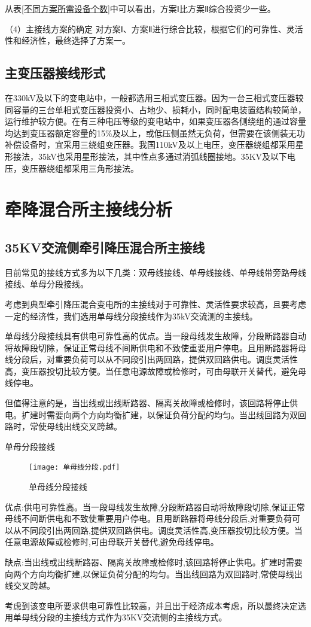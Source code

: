 从表\ref{不同方案所需设备个数}中可以看出，方案Ⅰ比方案Ⅱ综合投资少一些。\par 
（4）主接线方案的确定\newline
对方案Ⅰ、方案Ⅱ进行综合比较，根据它们的可靠性、灵活性和经济性，最终选择了方案一。 

\subsection{主变压器接线形式}
在330kV及以下的变电站中，一般都选用三相式变压器。因为一台三相式变压器较同容量的三台单相式变压器投资小、占地少、损耗小，同时配电装置结构较简单，运行维护较方便。在有三种电压等级的变电站中，如果变压器各侧绕组的通过容量均达到变压器额定容量的15\%及以上，或低压侧虽然无负荷，但需要在该侧装无功补偿设备时，宜采用三绕组变压器。我国110kV及以上电压，变压器绕组都采用星形接法，35kV也采用星形接法，其中性点多通过消弧线圈接地。35KV及以下电压，变压器绕组都采用三角形接法。
\section{牵降混合所主接线分析}

\subsection{35KV交流侧牵引降压混合所主接线}
目前常见的接线方式多为以下几类：双母线接线、单母线接线、单母线带旁路母线接线、单母分段接线。\par 
考虑到典型牵引降压混合变电所的主接线对于可靠性、灵活性要求较高，且要考虑一定的经济性，我们选用单母线分段接线作为35kV交流测的主接线。\par 
单母线分段接线具有供电可靠性高的优点。当一段母线发生故障，分段断路器自动将故障段切除，保证正常母线不间断供电和不致使重要用户停电。且用断路器将母线分段后，对重要负荷可以从不同段引出两回路，提供双回路供电。调度灵活性高，变压器投切比较方便。当任意电源故障或检修时，可由母联开关替代，避免母线停电。\par 
但值得注意的是，当出线或出线断路器、隔离关故障或检修时，该回路将停止供电。扩建时需要向两个方向均衡扩建，以保证负荷分配的均匀。当出线回路为双回路时，常使母线出线交叉跨越。\par 
单母分段接线\par 
\begin{figure}[!h]
	\centering
	\texttt{[image: 单母线分段.pdf]}
	\caption{单母线分段接线}
	\label{单母线分段接线}
\end{figure}
优点:供电可靠性高。当一段母线发生故障,分段断路器自动将故障段切除,保证正常母线不间断供电和不致使重要用户停电。且用断路器将母线分段后,对重要负荷可以从不同段引出两回路,提供双回路供电。调度灵活性高,变压器投切比较方便。当任意电源故障或检修时,可由母联开关替代,避免母线停电。\par
缺点:当出线或出线断路器、隔离关故障或检修时,该回路将停止供电。扩建时需要向两个方向均衡扩建,以保证负荷分配的均匀。当出线回路为双回路时,常使母线出线交叉跨越。\par
考虑到该变电所要求供电可靠性比较高，并且出于经济成本考虑，所以最终决定选用单母线分段的主接线方式作为35KV交流侧的主接线方式。

